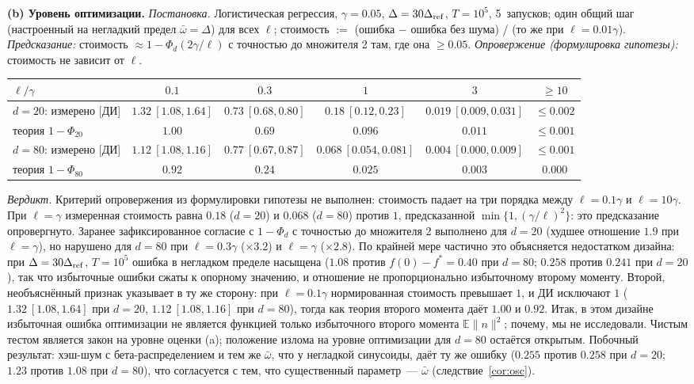 \documentclass[11pt,a4paper]{article}
\numberwithin{equation}{section}
\theoremstyle{definition}
\theoremstyle{remark}
\newcommand{\E}{\mathbb E}\newcommand{\R}{\mathbb R}\newcommand{\Z}{\mathbb Z}\let\Prob\relax\newcommand{\Prob}{\mathbb P}
\newcommand{\norm}[1]{\lVert #1\rVert}\newcommand{\abs}[1]{\lvert #1\rvert}\newcommand{\ip}[2]{\langle #1,#2\rangle}
\newcommand{\wbar}{\bar\omega}\newcommand{\Atwo}{\cA^{\rm 2pt}_\gamma}
\begin{document}
\textbf{(b) Уровень оптимизации.} \emph{Постановка.} Логистическая регрессия, $\gamma=0.05$, $\Delta=30\Delta_{\rm ref}$, $T=10^5$, 5~запусков; один общий шаг (настроенный на негладкий предел $\wbar=\Delta$) для всех $\ell$; стоимость $:=$ (ошибка $-$ ошибка без шума) / (то же при $\ell=0.01\gamma$). \emph{Предсказание:} стоимость $\approx1-\Phi_d(2\gamma/\ell)$ с точностью до множителя 2 там, где она $\ge0.05$. \emph{Опровержение (формулировка гипотезы):} стоимость не зависит от $\ell$.
\begin{center}\footnotesize\setlength{\tabcolsep}{3pt}
\begin{tabular}{@{}lccccc@{}}
\toprule
$\ell/\gamma$ & $0.1$ & $0.3$ & $1$ & $3$ & $\ge10$\\
\midrule
$d=20$: измерено [ДИ] & $1.32\ [1.08,1.64]$ & $0.73\ [0.68,0.80]$ & $0.18\ [0.12,0.23]$ & $0.019\ [0.009,0.031]$ & $\le0.002$\\
\quad теория $1-\Phi_{20}$ & $1.00$ & $0.69$ & $0.096$ & $0.011$ & $\le0.001$\\
$d=80$: измерено [ДИ] & $1.12\ [1.08,1.16]$ & $0.77\ [0.67,0.87]$ & $0.068\ [0.054,0.081]$ & $0.004\ [0.000,0.009]$ & $\le0.001$\\
\quad теория $1-\Phi_{80}$ & $0.92$ & $0.24$ & $0.025$ & $0.003$ & $0.000$\\
\bottomrule
\end{tabular}
\end{center}
\emph{Вердикт.} Критерий опровержения из формулировки гипотезы не выполнен: стоимость падает на три порядка между $\ell=0.1\gamma$ и $\ell=10\gamma$. При $\ell=\gamma$ измеренная стоимость равна $0.18$ ($d=20$) и $0.068$ ($d=80$) против $1$, предсказанной $\min\{1,(\gamma/\ell)^2\}$: это предсказание опровергнуто. Заранее зафиксированное согласие с $1-\Phi_d$ с точностью до множителя 2 выполнено для $d=20$ (худшее отношение $1.9$ при $\ell=\gamma$), но нарушено для $d=80$ при $\ell=0.3\gamma$ ($\times3.2$) и $\ell=\gamma$ ($\times2.8$). По крайней мере частично это объясняется недостатком дизайна: при $\Delta=30\Delta_{\rm ref}$, $T=10^5$ ошибка в негладком пределе насыщена ($1.08$ против $f(0)-f^*=0.40$ при $d=80$; $0.258$ против $0.241$ при $d=20$), так что избыточные ошибки сжаты к опорному значению, и отношение не пропорционально избыточному второму моменту. Второй, необъяснённый признак указывает в ту же сторону: при $\ell=0.1\gamma$ нормированная стоимость превышает $1$, и ДИ исключают $1$ ($1.32\ [1.08,1.64]$ при $d=20$, $1.12\ [1.08,1.16]$ при $d=80$), тогда как теория второго момента даёт $1.00$ и $0.92$. Итак, в этом дизайне избыточная ошибка оптимизации не является функцией только избыточного второго момента $\E\norm n^2$; почему, мы не исследовали. Чистым тестом является закон на уровне оценки (a); положение излома на уровне оптимизации для $d=80$ остаётся открытым. Побочный результат: хэш-шум с бета-распределением и тем же $\wbar$, что у негладкой синусоиды, даёт ту же ошибку ($0.255$ против $0.258$ при $d=20$; $1.23$ против $1.08$ при $d=80$), что согласуется с тем, что существенный параметр~--- $\wbar$ (следствие~\ref{cor:osc}).
\end{document}
